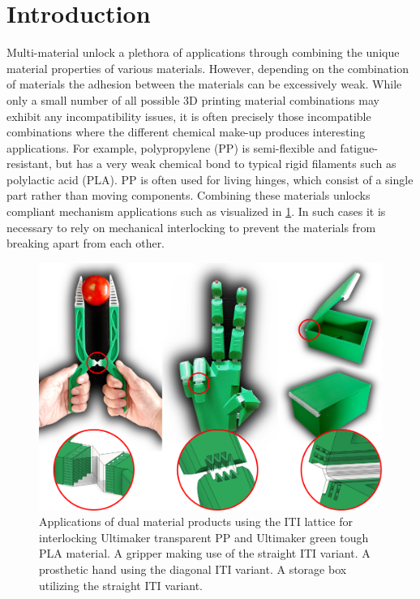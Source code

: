 \section{Introduction}\label{interlocking:sec:intro}
Multi-material  unlock a plethora of applications through combining the unique material properties of various materials.
However, depending on the combination of materials the adhesion between the materials can be excessively weak.
While only a small number of all possible 3D printing material combinations may exhibit any incompatibility issues,
it is often precisely those incompatible combinations where the different chemical make-up produces interesting applications.
For example, polypropylene (PP) is semi-flexible and fatigue-resistant, but has a very weak chemical bond to typical rigid filaments such as polylactic acid (PLA).
PP is often used for living hinges, which consist of a single part rather than moving components.
Combining these materials unlocks compliant mechanism applications such as visualized in \cref{interlocking:fig:applications}.
In such cases it is necessary to rely on mechanical interlocking to prevent the materials from breaking apart from each other.


\begin{figure}
	\centering
	\includegraphics[width=\columnwidth]{sources-applications-applications.png}
	\caption{Applications of dual material products using the ITI lattice for interlocking Ultimaker transparent PP and Ultimaker green tough PLA material.
	A gripper making use of the straight ITI variant.
	A prosthetic hand using the diagonal ITI variant.
	A storage box utilizing the straight ITI variant.
	}
	\label{interlocking:fig:applications}
\end{figure}





